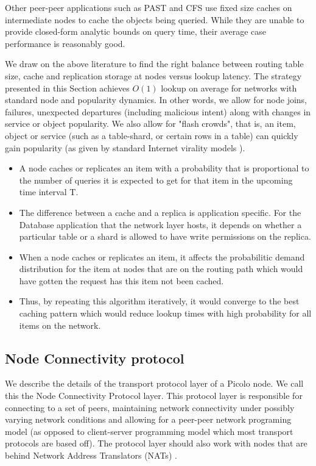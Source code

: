 Other peer-peer applications such as PAST \cite{past} and CFS \cite{cfs} use fixed size caches on intermediate nodes to
cache the objects being queried. While they are unable to provide closed-form analytic bounds on query time, their
average case performance is reasonably good.

We draw on the above literature to find the right balance between routing table size, cache and replication storage at
nodes versus lookup latency. The strategy presented in this Section achieves \(O(1)\) lookup on average for networks with standard node
and popularity dynamics. In other words, we allow for node joins, failures, unexpected departures (including malicious
intent) along with changes in service or object popularity. We also allow for "flash crowds", that is, an item, object
or service (such as a table-shard, or certain rows in a table) can quickly gain popularity (as given by standard
Internet virality models \cite{virality_model}).

\begin{itemize}
    \item A node caches or replicates an item with a probability that is proportional to the number of queries it is
        expected to get for that item in the upcoming time interval T.
    \item The difference between a cache and a replica is application specific. For the Database application that the
        network layer hosts, it depends on whether a particular table or a shard is allowed to have write permissions on
        the replica.
    \item When a node caches or replicates an item, it affects the probabilitic demand distribution for the item at
        nodes that are on the routing path which would have gotten the request has this item not been cached.
    \item Thus, by repeating this algorithm iteratively, it would converge to the best caching pattern which would reduce
        lookup times with high probability for all items on the network.
\end{itemize}

\subsection{Node Connectivity protocol}
\label{net:net_proto}

We describe the details of the transport protocol layer of a Picolo node. We call this the Node Connectivity Protocol
layer. This protocol layer is responsible for connecting to a set of peers, maintaining network connectivity under
possibly varying network conditions and allowing for a peer-peer network programing model (as opposed to client-server
programming model which most transport protocols are based off).  The protocol layer should also work with nodes that
are behind Network Address Translators (NATs) \cite{nats}.

